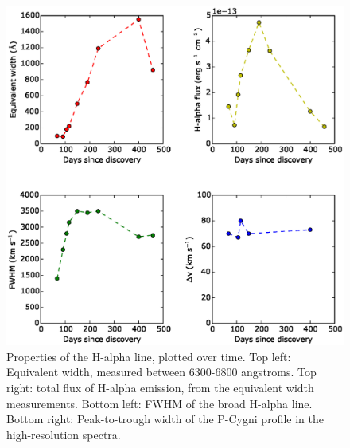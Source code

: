 \documentclass[iop]{emulateapj}
\begin{document}
\begin{figure}
  \includegraphics[width=\linewidth]{graphics/H-alpha_stats.eps}
  \caption{Properties of the H-alpha line, plotted over time. Top left: Equivalent width, measured between 6300-6800 angstroms. Top right: total flux of H-alpha emission, from the equivalent width measurements. Bottom left: FWHM of the broad H-alpha line. Bottom right: Peak-to-trough width of the P-Cygni profile in the high-resolution spectra.}
  \label{fig:stats}
\end{figure}
\end{document}
